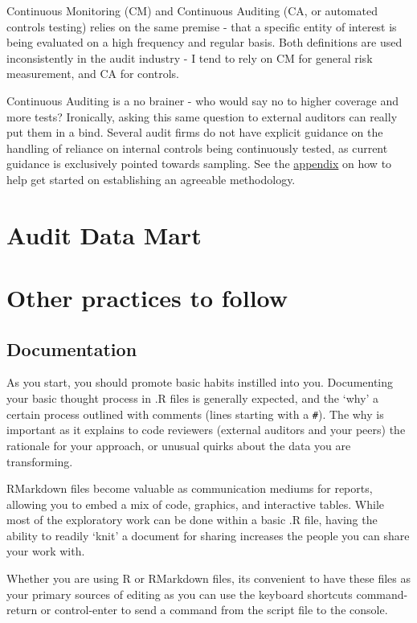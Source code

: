 \documentclass[
]{book}
\begin{document}
Continuous Monitoring (CM) and Continuous Auditing (CA, or automated controls testing) relies on the same premise - that a specific entity of interest is being evaluated on a high frequency and regular basis. Both definitions are used inconsistently in the audit industry - I tend to rely on CM for general risk measurement, and CA for controls.

Continuous Auditing is a no brainer - who would say no to higher coverage and more tests? Ironically, asking this same question to external auditors can really put them in a bind. Several audit firms do not have explicit guidance on the handling of reliance on internal controls being continuously tested, as current guidance is exclusively pointed towards sampling. See the \protect\hyperlink{appendixct}{appendix} on how to help get started on establishing an agreeable methodology.

\hypertarget{applied-adw}{%
\chapter{Audit Data Mart}\label{applied-adw}}

\hypertarget{other-practices-to-follow}{%
\chapter{Other practices to follow}\label{other-practices-to-follow}}

\hypertarget{documentation}{%
\section{Documentation}\label{documentation}}

As you start, you should promote basic habits instilled into you. Documenting your basic thought process in .R files is generally expected, and the `why' a certain process outlined with comments (lines starting with a \texttt{\#}). The why is important as it explains to code reviewers (external auditors and your peers) the rationale for your approach, or unusual quirks about the data you are transforming.

RMarkdown files become valuable as communication mediums for reports, allowing you to embed a mix of code, graphics, and interactive tables. While most of the exploratory work can be done within a basic .R file, having the ability to readily `knit' a document for sharing increases the people you can share your work with.

Whether you are using R or RMarkdown files, its convenient to have these files as your primary sources of editing as you can use the keyboard shortcuts command-return or control-enter to send a command from the script file to the console.
\end{document}
